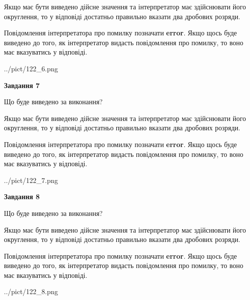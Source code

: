 \documentclass[12pt, ukrainian]{article}
\begin{document}
{\begin {Large}
Якщо має бути виведено дійсне значення та інтерпретатор має здійснювати його округлення, 
то у відповіді достатньо правильно вказати два дробових розряди.

Повідомлення інтерпретатора про помилку позначати \textbf{error}.
Якщо щось буде виведено до того, як інтерпретатор видасть повідомлення про помилку, 
то воно має вказуватись у відповіді. \par

\begin{center}
	{../pict/122_6.png}
\end{center}
\newpage

{\begin {center}\textbf{Завдання 7}\end {center}}\par
Що буде виведено за виконання? \par

Якщо має бути виведено дійсне значення та інтерпретатор має здійснювати його округлення, 
то у відповіді достатньо правильно вказати два дробових розряди.

Повідомлення інтерпретатора про помилку позначати \textbf{error}.
Якщо щось буде виведено до того, як інтерпретатор видасть повідомлення про помилку, 
то воно має вказуватись у відповіді. \par

\begin{center}
	{../pict/122_7.png}
\end{center}
\newpage

{\begin {center}\textbf{Завдання 8}\end {center}}\par
Що буде виведено за виконання? \par

Якщо має бути виведено дійсне значення та інтерпретатор має здійснювати його округлення, 
то у відповіді достатньо правильно вказати два дробових розряди.

Повідомлення інтерпретатора про помилку позначати \textbf{error}.
Якщо щось буде виведено до того, як інтерпретатор видасть повідомлення про помилку, 
то воно має вказуватись у відповіді. \par

\begin{center}
	{../pict/122_8.png}
\end{center}
\newpage


\end{Large}}
\end{document}
